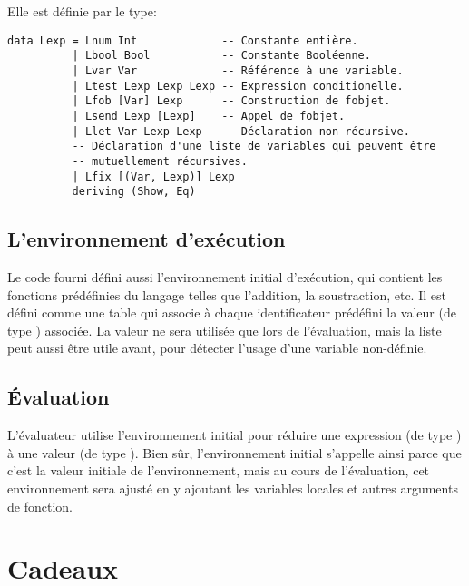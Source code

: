 \documentclass{article}
\begin{document}
Elle est définie par le type:

{\small
\begin{verbatim}
data Lexp = Lnum Int             -- Constante entière.
          | Lbool Bool           -- Constante Booléenne.
          | Lvar Var             -- Référence à une variable.
          | Ltest Lexp Lexp Lexp -- Expression conditionelle.
          | Lfob [Var] Lexp      -- Construction de fobjet.
          | Lsend Lexp [Lexp]    -- Appel de fobjet.
          | Llet Var Lexp Lexp   -- Déclaration non-récursive.
          -- Déclaration d'une liste de variables qui peuvent être
          -- mutuellement récursives.
          | Lfix [(Var, Lexp)] Lexp
          deriving (Show, Eq)
\end{verbatim}
}

\subsection{L'environnement d'exécution}

Le code fourni défini aussi l'environnement initial d'exécution, qui
contient les fonctions prédéfinies du langage telles que l'addition, la
soustraction, etc.  Il est défini comme une table qui associe à chaque
identificateur prédéfini la valeur (de type ) associée.  La valeur
ne sera utilisée que lors de l'évaluation, mais la liste peut aussi être
utile avant, pour détecter l'usage d'une variable non-définie.

\subsection{Évaluation}

L'évaluateur utilise l'environnement initial pour réduire une expression
(de type ) à une valeur (de type ).
Bien sûr, l'environnement initial s'appelle ainsi parce que c'est la valeur
initiale de l'environnement, mais au cours de l'évaluation, cet
environnement sera ajusté en y ajoutant les variables locales et autres
arguments de fonction.

\section{Cadeaux}
\end{document}
